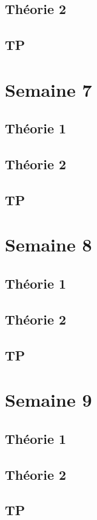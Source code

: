 \documentclass{article}
\begin{document}
\subsection{Théorie 2}
\subsection{TP}

\pagebreak
\section{Semaine 7}
\subsection{Théorie 1}
\subsection{Théorie 2}
\subsection{TP}

\pagebreak
\section{Semaine 8}
\subsection{Théorie 1}
\subsection{Théorie 2}
\subsection{TP}

\pagebreak
\section{Semaine 9}
\subsection{Théorie 1}
\subsection{Théorie 2}
\subsection{TP}
\end{document}
